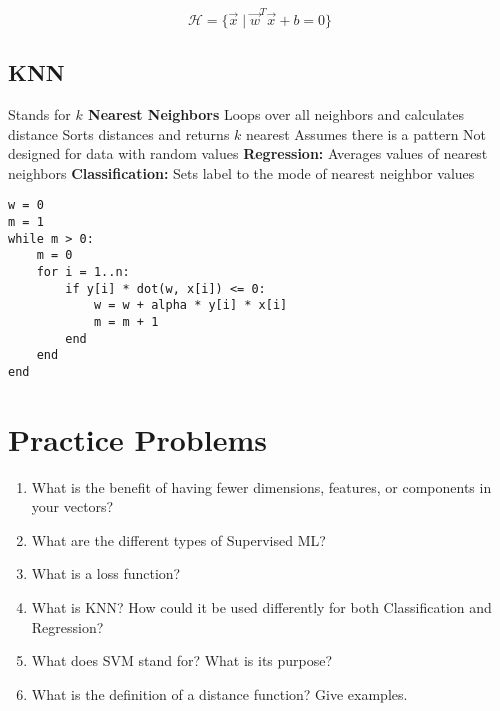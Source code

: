 \documentclass[12pt]{article}
\begin{document}
\[
\mathcal{H} = \{\vec{x} \mid \vec{w}^T\vec{x} + b = 0\}
\]

\subsection{KNN\cite{guo2003knn}}
\begin{outline}
    \1 Stands for \textbf{\(k\) Nearest Neighbors}
    \1 Loops over all neighbors and calculates distance
    \1 Sorts distances and returns \(k\) nearest
    \1 Assumes there is a pattern
    \1 Not designed for data with random values
    \1 \textbf{Regression:} Averages values of nearest neighbors
    \1 \textbf{Classification:} Sets label to the mode of nearest neighbor values
\end{outline}

\begin{verbatim}
w = 0
m = 1
while m > 0:
    m = 0
    for i = 1..n:
        if y[i] * dot(w, x[i]) <= 0:
            w = w + alpha * y[i] * x[i]
            m = m + 1
        end
    end
end
\end{verbatim}

\section{Practice Problems}

\begin{enumerate}
    \item What is the benefit of having fewer dimensions, features, or components in your vectors?
    \item What are the different types of Supervised ML?
    \item What is a loss function?
    \item What is KNN? How could it be used differently for both Classification and Regression?
    \item What does SVM stand for? What is its purpose?
    \item What is the definition of a distance function? Give examples.
\end{enumerate}



\end{document}
